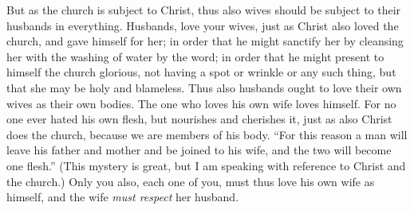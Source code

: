 \begin{biblechapter}
\verse But as the church is subject to Christ, thus also wives should be subject to their husbands in everything.
 Husbands, love your wives, just as Christ also loved the church, and gave himself for her;
\verse in order that he might sanctify her by cleansing her with the washing of water by the word;
\verse in order that he might present to himself the church glorious, not having a spot or wrinkle or any such thing, but that she may be holy and blameless.
\verse Thus also husbands ought to love their own wives as their own bodies. The one who loves his own wife loves himself.
\verse For no one ever hated his own flesh, but nourishes and cherishes it, just as also Christ does the church,
\verse because we are members of his body.
\verse “For this reason a man will leave his father and mother and be joined to his wife, and the two will become one flesh.”
\verse (This mystery is great, but I am speaking with reference to Christ and the church.)
\verse Only you also, each one of you, must thus love his own wife as himself, and the wife \textit{must respect} her husband.
\end{biblechapter}

